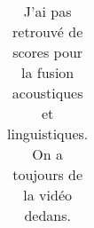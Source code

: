 \begin{table}[]
    \centering
    \begin{tabular}{| l | l | c | c | c |}
        \hline

       \hline
    \end{tabular}
    \caption{J'ai pas retrouvé de scores pour la fusion acoustiques et linguistiques. On a toujours de la vidéo dedans.}
    \label{tab:avecmulti}
\end{table}
